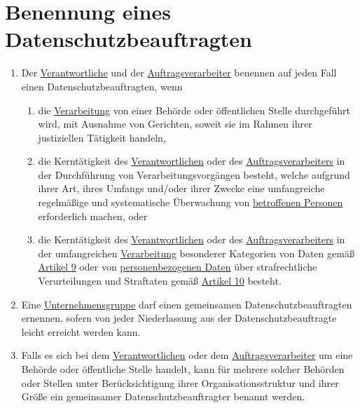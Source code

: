 \chapter{Benennung eines Datenschutzbeauftragten}
\label{ch:37}


\begin{enumerate}

  \item Der \hyperref[itm:04-7]{Verantwortliche} und der \hyperref[itm:04-8]{Auftragsverarbeiter} benennen auf jeden
   Fall einen Datenschutzbeauftragten, wenn
  \label{itm:37-1}

  \begin{enumerate}
  
    \item die \hyperref[itm:04-2]{Verarbeitung} von einer Behörde oder öffentlichen Stelle durchgeführt wird, mit
     Ausnahme von Gerichten, soweit sie im Rahmen ihrer justiziellen Tätigkeit handeln,
    \label{itm:37-1a}

    \item die Kerntätigkeit des \hyperref[itm:04-7]{Verantwortlichen} oder des \hyperref[itm:04-8]
     {Auftragsverarbeiters} in der Durchführung von Verarbeitungsvorgängen besteht, welche aufgrund ihrer Art, ihres
     Umfangs und/oder ihrer Zwecke eine umfangreiche regelmäßige und systematische Überwachung von \hyperref[itm:04-1]
     {betroffenen Personen} erforderlich machen, oder
    \label{itm:37-1b}

    \item die Kerntätigkeit des \hyperref[itm:04-7]{Verantwortlichen} oder des \hyperref[itm:04-8]
     {Auftragsverarbeiters} in der umfangreichen \hyperref[itm:04-2]{Verarbeitung} besonderer Kategorien von Daten
     gemäß \hyperref[ch:9]{Artikel 9} oder von \hyperref[itm:04-1]{personenbezogenen Daten} über strafrechtliche
     Verurteilungen und Straftaten gemäß \hyperref[ch:10]{Artikel 10} besteht.
    \label{itm:37-1c}

  \end{enumerate}

  \item Eine \hyperref[itm:04-19]{Unternehmensgruppe} darf einen gemeinsamen Datenschutzbeauftragten ernennen, sofern
   von jeder Niederlassung aus der Datenschutzbeauftragte leicht erreicht werden kann.
  \label{itm:37-2}

  \item Falls es sich bei dem \hyperref[itm:04-7]{Verantwortlichen} oder dem \hyperref[itm:04-8]{Auftragsverarbeiter} um
   eine Behörde oder öffentliche Stelle handelt, kann für mehrere solcher Behörden oder Stellen unter Berücksichtigung
   ihrer Organisationsstruktur und ihrer Größe ein gemeinsamer Datenschutzbeauftragter benannt werden.
  \label{itm:37-3}


\end{enumerate}
